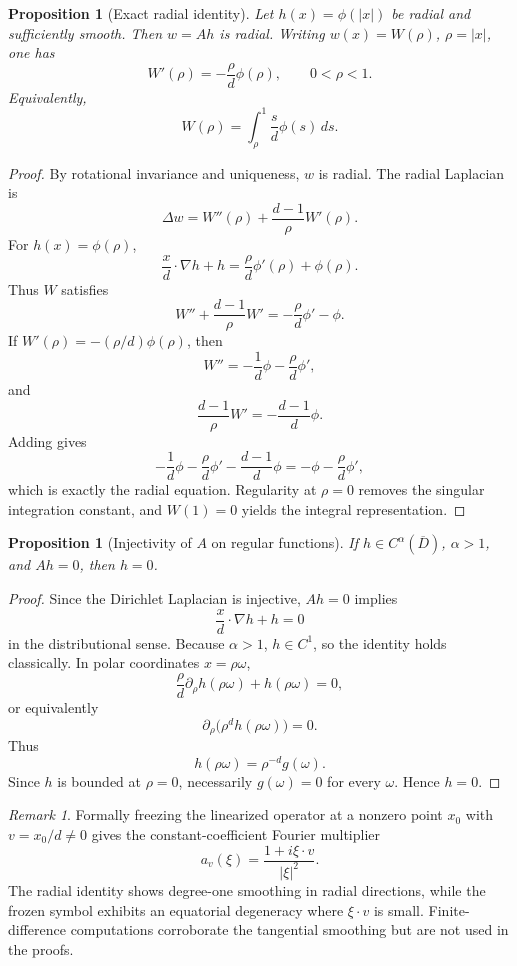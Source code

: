 \documentclass[12pt]{article}
\newtheorem{proposition}[theorem]{Proposition}
\theoremstyle{remark}
\newtheorem{remark}[theorem]{Remark}
\begin{document}
\begin{proposition}[Exact radial identity]
\label{prop:radial-identity}
Let \(h(x)=\phi(|x|)\) be radial and sufficiently smooth. Then \(w=Ah\) is radial. Writing \(w(x)=W(\rho)\), \(\rho=|x|\), one has
\[
W'(\rho)=-\frac{\rho}{d}\phi(\rho),
\qquad 0<\rho<1.
\]
Equivalently,
\[
W(\rho)=\int_\rho^1 \frac{s}{d}\phi(s)\,ds.
\]
\end{proposition}
\begin{proof}
By rotational invariance and uniqueness, \(w\) is radial. The radial Laplacian is
\[
\Delta w=W''(\rho)+\frac{d-1}{\rho}W'(\rho).
\]
For \(h(x)=\phi(\rho)\),
\[
\frac{x}{d}\cdot\nabla h+h
=
\frac{\rho}{d}\phi'(\rho)+\phi(\rho).
\]
Thus \(W\) satisfies
\[
W''+\frac{d-1}{\rho}W'
=
-\frac{\rho}{d}\phi'-\phi.
\]
If \(W'(\rho)=-(\rho/d)\phi(\rho)\), then
\[
W''=-\frac1d\phi-\frac{\rho}{d}\phi',
\]
and
\[
\frac{d-1}{\rho}W'
=
-\frac{d-1}{d}\phi.
\]
Adding gives
\[
-\frac1d\phi-\frac{\rho}{d}\phi'-\frac{d-1}{d}\phi
=
-\phi-\frac{\rho}{d}\phi',
\]
which is exactly the radial equation. Regularity at \(\rho=0\) removes the singular integration constant, and \(W(1)=0\) yields the integral representation.
\end{proof}

\begin{proposition}[Injectivity of \(A\) on regular functions]
\label{prop:injectivity}
If \(h\in C^\alpha(\overline D)\), \(\alpha>1\), and \(Ah=0\), then \(h=0\).
\end{proposition}
\begin{proof}
Since the Dirichlet Laplacian is injective, \(Ah=0\) implies
\[
\frac{x}{d}\cdot\nabla h+h=0
\]
in the distributional sense. Because \(\alpha>1\), \(h\in C^1\), so the identity holds classically. In polar coordinates \(x=\rho\omega\),
\[
\frac{\rho}{d}\partial_\rho h(\rho\omega)+h(\rho\omega)=0,
\]
or equivalently
\[
\partial_\rho\bigl(\rho^d h(\rho\omega)\bigr)=0.
\]
Thus
\[
h(\rho\omega)=\rho^{-d}g(\omega).
\]
Since \(h\) is bounded at \(\rho=0\), necessarily \(g(\omega)=0\) for every \(\omega\). Hence \(h=0\).
\end{proof}

\begin{remark}
Formally freezing the linearized operator at a nonzero point \(x_0\) with \(v=x_0/d\neq0\) gives the constant-coefficient Fourier multiplier
\[
a_v(\xi)=\frac{1+i\xi\cdot v}{|\xi|^2}.
\]
The radial identity shows degree-one smoothing in radial directions, while the frozen symbol exhibits an equatorial degeneracy where \(\xi\cdot v\) is small. Finite-difference computations corroborate the tangential smoothing but are not used in the proofs.
\end{remark}
\end{document}
